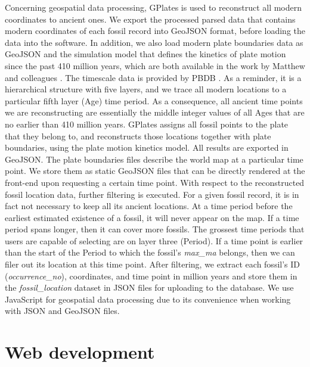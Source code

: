 \documentclass[11pt, a4paper,oneside,chapterprefix=false]{scrbook}
\begin{document}
Concerning geospatial data processing, GPlates is used to reconstruct all modern coordinates to ancient ones. We export the processed parsed data that contains modern coordinates of each fossil record into GeoJSON format, before loading the data into the software. In addition, we also load modern plate boundaries data as GeoJSON and the simulation model that defines the kinetics of plate motion since the past 410 million years, which are both available in the work by Matthew and colleagues \cite{matthews2016global}. The timescale data is provided by PBDB \cite{peters2016paleobiology}. As a reminder, it is a hierarchical structure with five layers, and we trace all modern locations to a particular fifth layer (Age) time period. As a consequence, all ancient time points we are reconstructing are essentially the middle integer values of all Ages that are no earlier than 410 million years. GPlates assigns all fossil points to the plate that they belong to, and reconstructs those locations together with plate boundaries, using the plate motion kinetics model. All results are exported in GeoJSON. The plate boundaries files describe the world map at a particular time point. We store them as static GeoJSON files that can be directly rendered at the front-end upon requesting a certain time point. With respect to the reconstructed fossil location data, further filtering is executed. For a given fossil record, it is in fact not necessary to keep all its ancient locations. At a time period before the earliest estimated existence of a fossil, it will never appear on the map. If a time period spans longer, then it can cover more fossils. The grossest time periods that users are capable of selecting are on layer three (Period). If a time point is earlier than the start of the Period to which the fossil's \emph{max\_ma} belongs, then we can filer out its location at this time point. After filtering, we extract each fossil's ID (\emph{occurrence\_no}), coordinates, and time point in million years and store them in the \emph{fossil\_location} dataset in JSON files for uploading to the database. We use JavaScript for geospatial data processing due to its convenience when working with JSON and GeoJSON files.   

\section{Web development}\label{sec:implementation_web_development}
\end{document}
